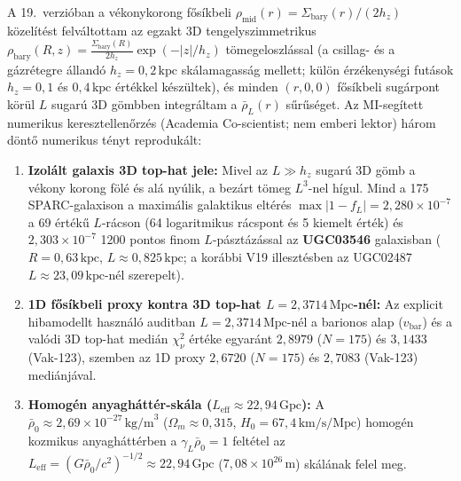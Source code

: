 \documentclass[10pt,a4paper]{article}
\begin{document}
\par
A 19.\ verzi\'oban a v\'ekonykorong f\H{o}s\'ikbeli $\rho_{\text{mid}}(r) = \Sigma_{\text{bary}}(r)/(2h_z)$ k\"ozel\'it\'est felv\'altottam az egzakt 3D tengelyszimmetrikus $\rho_{\text{bary}}(R,z) = \frac{\Sigma_{\text{bary}}(R)}{2h_z}\exp(-|z|/h_z)$ t\"omegeloszl\'assal (a csillag- \'es a g\'azr\'etegre \'alland\'o $h_z = 0{,}2\,\text{kpc}$ sk\'alamagass\'ag mellett; k\"ul\"on \'erz\'ekenys\'egi fut\'asok $h_z = 0{,}1$ \'es $0{,}4\,\text{kpc}$ \'ert\'ekkel k\'esz\"ultek), \'es minden $(r,0,0)$ f\H{o}s\'ikbeli sug\'arpont k\"or\"ul $L$ sugar\'u 3D g\"ombben integr\'altam a $\bar{\rho}_L(r)$ s\H{u}r\H{u}s\'eget. Az MI-seg\'itett numerikus keresztellen\H{o}rz\'es (Academia Co-scientist; nem emberi lektor) h\'arom d\"ont\H{o} numerikus t\'enyt reproduk\'alt:
\begin{enumerate}\setlength{\itemsep}{1pt}\setlength{\parskip}{0pt}\setlength{\topsep}{1pt}
  \item \textbf{Izol\'alt galaxis 3D top-hat jele:} Mivel az $L \gg h_z$ sugar\'u 3D g\"omb a v\'ekony korong f\"ol\'e \'es al\'a ny\'ulik, a bez\'art t\"omeg $L^3$-nel h\'igul. Mind a 175 SPARC-galaxison a maxim\'alis galaktikus elt\'er\'es $\max |1 - f_L| = 2{,}280\times 10^{-7}$ a 69 \'ert\'ek\H{u} $L$-r\'acson (64 logaritmikus r\'acspont \'es 5 kiemelt \'ert\'ek) \'es \textbf{$2{,}303\times 10^{-7}$} 1200 pontos finom $L$-p\'aszt\'az\'assal az \textbf{UGC03546} galaxisban ($R = 0{,}63\,\text{kpc}$, $L \approx 0{,}825\,\text{kpc}$; a kor\'abbi V19 illeszt\'esben az UGC02487 $L \approx 23{,}09\,\text{kpc}$-n\'el szerepelt).
  \item \textbf{1D f\H{o}s\'ikbeli proxy kontra 3D top-hat $L = 2{,}3714\,\text{Mpc}$-n\'el:} Az explicit hibamodellt haszn\'al\'o auditban $L = 2{,}3714\,\text{Mpc}$-n\'el a barionos alap ($v_{\text{bar}}$) \'es a val\'odi 3D top-hat medi\'an $\chi^2_\nu$ \'ert\'eke egyar\'ant \textbf{$2{,}8979$} ($N=175$) \'es \textbf{$3{,}1433$} (Vak-123), szemben az 1D proxy $2{,}6720$ ($N=175$) \'es $2{,}7083$ (Vak-123) medi\'anj\'aval.
  \item \textbf{Homog\'en anyagh\'att\'er-sk\'ala ($L_{\text{eff}} \approx 22{,}94\,\text{Gpc}$):} A $\bar{\rho}_0 \approx 2{,}69\times 10^{-27}\,\text{kg/m}^3$ ($\Omega_m \approx 0{,}315$, $H_0 = 67{,}4\,\text{km/s/Mpc}$) homog\'en kozmikus anyagh\'att\'erben a $\gamma_L\bar{\rho}_0 = 1$ felt\'etel az $L_{\text{eff}} = (G\bar{\rho}_0/c^2)^{-1/2} \approx 22{,}94\,\text{Gpc}$ ($7{,}08\times 10^{26}\,\text{m}$) sk\'al\'anak felel meg.
\end{enumerate}
\end{document}
